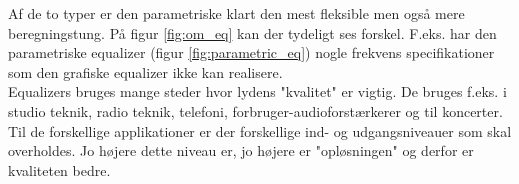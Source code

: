 Af de to typer er den parametriske klart den mest fleksible men også mere beregningstung. På figur \ref{fig:om_eq} kan der tydeligt ses forskel. F.eks. har den parametriske equalizer (figur \ref{fig:parametric_eq}) nogle frekvens specifikationer som den grafiske equalizer ikke kan realisere.\\

Equalizers bruges mange steder hvor lydens "kvalitet" er vigtig. De bruges f.eks. i studio teknik, radio teknik, telefoni, forbruger-audioforstærkerer og til koncerter. Til de forskellige applikationer er der forskellige ind- og udgangsniveauer som skal overholdes. Jo højere dette niveau er, jo højere er "opløsningen" og derfor er kvaliteten bedre. 